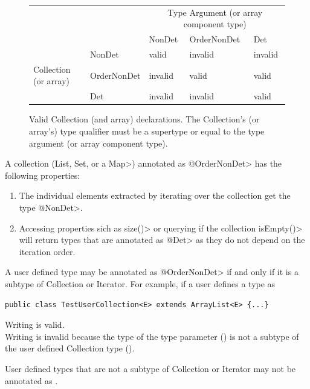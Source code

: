 \begin{figure}
    \centering
    \begin{tabular}{|l|l|l|l|l|}
        \cline{3-5}
        \multicolumn{2}{c|}{~}  &  \multicolumn{3}{c|}{Type Argument (or array component type)} \\ \cline{3-5}
        \multicolumn{2}{c|}{~}  & NonDet     & OrderNonDet & Det \\ \hline
        & NonDet      &   valid    &  invalid    & invalid  \\ \cline{2-5}
        Collection (or array)   & OrderNonDet &   invalid  &  valid      & valid  \\ \cline{2-5}
        & Det         &   invalid  &  invalid    & valid      \\ \hline
    \end{tabular}
    \caption{Valid Collection (and array) declarations.  The Collection's (or array's) type qualifier
        must be a supertype or equal to the type argument (or array component type).}
    \label{fig-determinism-collections}
\end{figure}

A collection (\<List, Set, or a Map>) annotated as \<@OrderNonDet> has the following properties:
\begin{enumerate}
    \item The individual elements extracted by iterating over the collection get the type \<@NonDet>.
    \item Accessing properties sich as \<size()> or querying if the collection \<isEmpty()> will return types
    that are annotated as \<@Det> as they do not depend on the iteration order. 
\end{enumerate}

A user defined type may be annotated as \<@OrderNonDet> if and only if it
is a subtype of Collection or Iterator.
For example, if a user defines a type as
\begin{verbatim}
public class TestUserCollection<E> extends ArrayList<E> {...}
\end{verbatim}
Writing  is valid.\\
Writing  is invalid
because the type of the type parameter () is not a subtype
of the user defined Collection type ().

User defined types that are not a subtype of Collection or Iterator
may not be annotated as .


